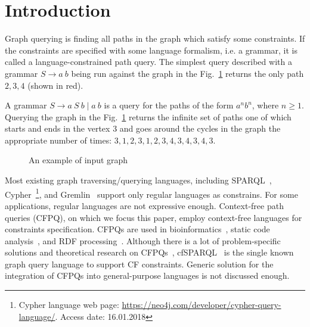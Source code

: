 \section{Introduction}

Graph querying is finding all paths in the graph which satisfy some constraints.
If the constraints are specified with some language formalism, i.e. a grammar, it is called a language-constrained path query. The simplest query described with a grammar $S \rightarrow a \ b$ being run against the graph in the Fig.~\ref{fig:exmplInputGraph} returns the only path $2, 3, 4$ (shown in red).

A grammar $S \rightarrow a \ S \ b \mid a \ b$ is a query for the paths of the form $a^n b^n$, where $n \geq 1$.
Querying the graph in the Fig.~\ref{fig:exmplInputGraph} returns the infinite set of paths one of which starts and ends in the vertex $3$ and goes around the cycles in the graph the appropriate number of times: $3,1,2,3,1,2,3,4,3,4,3,4,3$.

\begin{figure}[h]
\caption{An example of input graph}
\label{fig:exmplInputGraph}
\end{figure}

Most existing graph traversing/querying languages, including SPARQL~\cite{sparql}, Cypher~\footnote{Cypher language web page: \url{https://neo4j.com/developer/cypher-query-language/}. Access date: 16.01.2018}, and Gremlin~\cite{gremlin} support only regular languages as constrains.
For some applications, regular languages are not expressive enough.
Context-free path queries (CFPQ), on which we focus this paper, employ context-free languages for constraints specification.
CFPQs are used in bioinformatics~\cite{GraphQueryWithEarley}, static code analysis~\cite{Reps, Zheng, LabelFlowCFLReachability, specificationCFLReachability, JavaCFL}, and RDF processing~\cite{CFGonRDF}.
Although there is a lot of problem-specific solutions and theoretical research on CFPQs~\cite{Yannakakis, ConjCFPathQuery, Hellings16, GrigorevR16, QueryGraphWithData, RegularDBQuery, GraphQueryWithEarley, graphDB}, cfSPARQL~\cite{CFGonRDF} is the single known graph query language to support CF constraints.
Generic solution for the integration of CFPQs into general-purpose languages is not discussed enough.

